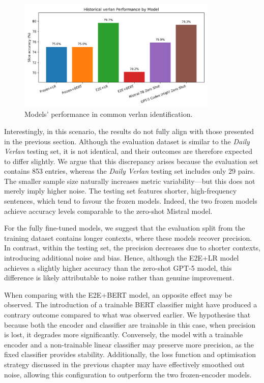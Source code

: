 \documentclass[12pt]{article}
\begin{document}
\begin{figure}[H]
    \centering
    \includegraphics[width=0.85\textwidth]{figures/historical_verlan_comparison.png}
    \caption{Models' performance in common verlan identification.}
    \label{fig:historical-verlan-comparison}
\end{figure}

Interestingly, in this scenario, the results do not fully align with those presented in the previous section. 
Although the evaluation dataset is similar to the \textit{Daily Verlan} testing set, it is not identical, and their outcomes are therefore expected to differ slightly. 
We argue that this discrepancy arises because the evaluation set contains 853 entries, whereas the \textit{Daily Verlan} testing set includes only 29 pairs. 
The smaller sample size naturally increases metric variability\;---\;but this does not merely imply higher noise. 
The testing set features shorter, high-frequency sentences, which tend to favour the frozen models. 
Indeed, the two frozen models achieve accuracy levels comparable to the zero-shot Mistral model.

For the fully fine-tuned models, we suggest that the evaluation split from the training dataset contains longer contexts, where these models recover precision. 
In contrast, within the testing set, the precision decreases due to shorter contexts, introducing additional noise and bias. 
Hence, although the E2E+LR model achieves a slightly higher accuracy than the zero-shot GPT-5 model, this difference is likely attributable to noise rather than genuine improvement.

When comparing with the E2E+BERT model, an opposite effect may be observed. 
The introduction of a trainable BERT classifier might have produced a contrary outcome compared to what was observed earlier. 
We hypothesise that because both the encoder and classifier are trainable in this case, when precision is lost, it degrades more significantly. 
Conversely, the model with a trainable encoder and a non-trainable linear classifier may preserve more precision, as the fixed classifier provides stability. 
Additionally, the loss function and optimisation strategy discussed in the previous chapter may have effectively smoothed out noise, allowing this configuration to outperform the two frozen-encoder models.
\end{document}
